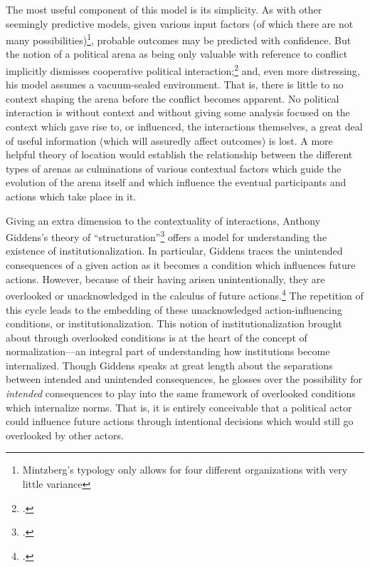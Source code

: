 \documentclass[openany,twoside]{memoir}
\begin{document}
\begin{Spacing}{2}
The most useful component of this model is its simplicity. 
As with other seemingly predictive models, given various input factors (of which there are not many possibilities)\footnote{
Mintzberg's typology only allows for four different organizations with very little variance}, 
probable outcomes may be predicted with confidence. 
But the notion of a political arena as being only valuable with reference to conflict implicitly dismisses cooperative political interaction;\footcite[152]{mintzberg85} and, even more distressing, his model assumes a vacuum-sealed environment. 
That is, there is little to no context shaping the arena before the conflict becomes apparent. 
No political interaction is without context and without giving some analysis focused on the context which gave rise to, or influenced, the interactions themselves, a great deal of useful information (which will assuredly affect outcomes) is lost.
A more helpful theory of location would establish the relationship between the different types of arenas as culminations of various contextual factors which guide the evolution of the arena itself and which influence the eventual participants and actions which take place in it.

Giving an extra dimension to the contextuality of interactions, Anthony Giddens's theory of ``structuration''\footcite{giddens86} offers a model for understanding the existence of institutionalization.
In particular, Giddens traces the unintended consequences of a given action as it becomes a condition which influences future actions.
However, because of their having arisen unintentionally, they are overlooked or unacknowledged in the calculus of future actions.\footcite[5]{giddens86}
The repetition of this cycle leads to the embedding of these unacknowledged action-influencing conditions, or institutionalization.
This notion of institutionalization brought about through overlooked conditions is at the heart of the concept of normalization---an integral part of understanding how institutions become internalized.
Though Giddens speaks at great length about the separations between intended and unintended consequences, he glosses over the possibility for \emph{intended} consequences to play into the same framework of overlooked conditions which internalize norms.
That is, it is entirely conceivable that a political actor could influence future actions through intentional decisions which would still go overlooked by other actors. 


\end{Spacing}
\end{document}
